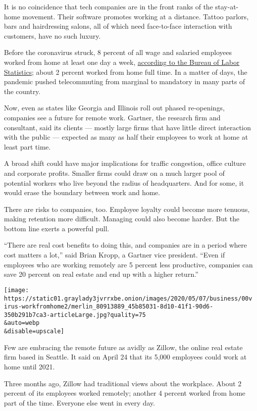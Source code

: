It is no coincidence that tech companies are in the front ranks of the
stay-at-home movement. Their software promotes working at a distance.
Tattoo parlors, bars and hairdressing salons, all of which need
face-to-face interaction with customers, have no such luxury.

Before the coronavirus struck, 8 percent of all wage and salaried
employees worked from home at least one day a week,
\href{https://www.bls.gov/news.release/flex2.t03.htm}{according to the
Bureau of Labor Statistics}; about 2 percent worked from home full time.
In a matter of days, the pandemic pushed telecommuting from marginal to
mandatory in many parts of the country.

Now, even as states like Georgia and Illinois roll out phased
re-openings, companies see a future for remote work. Gartner, the
research firm and consultant, said its clients --- mostly large firms
that have little direct interaction with the public --- expected as many
as half their employees to work at home at least part time.

A broad shift could have major implications for traffic congestion,
office culture and corporate profits. Smaller firms could draw on a much
larger pool of potential workers who live beyond the radius of
headquarters. And for some, it would erase the boundary between work and
home.

There are risks to companies, too. Employee loyalty could become more
tenuous, making retention more difficult. Managing could also become
harder. But the bottom line exerts a powerful pull.

``There are real cost benefits to doing this, and companies are in a
period where cost matters a lot,'' said Brian Kropp, a Gartner vice
president. ``Even if employees who are working remotely are 5 percent
less productive, companies can save 20 percent on real estate and end up
with a higher return.''

\texttt{[image: https://static01.graylady3jvrrxbe.onion/images/2020/05/07/business/00virus-workfromhome2/merlin\_80913889\_45b85031-8d10-41f1-90d6-350b291b7ca3-articleLarge.jpg?quality=75\\\&auto=webp\\\&disable=upscale]}

Few are embracing the remote future as avidly as Zillow, the online real
estate firm based in Seattle. It said on April 24 that its 5,000
employees could work at home until 2021.

Three months ago, Zillow had traditional views about the workplace.
About 2 percent of its employees worked remotely; another 4 percent
worked from home part of the time. Everyone else went in every day.

